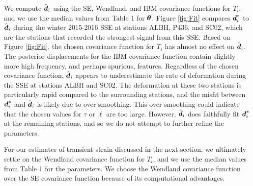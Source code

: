 \documentclass[extra,mreferee]{gji}
\begin{document}
We compute $\hat{\data}_i$ using the SE, Wendland, and IBM covariance
functions for $T_i$, and we use the median values from Table 1 for
$\mitbf{\theta}$. Figure \ref{fig:Fit} compares $\data_i^*$ to
$\hat{\data}_i$ during the winter 2015-2016 SSE at stations ALBH,
P436, and SC02, which are the stations that recorded the strongest
signal from this SSE. Based on Figure \ref{fig:Fit}, the chosen
covariance function for $T_i$ has almost no effect on $\hat{\data}_i$.
The posterior displacements for the IBM covariance function contain
slightly more high frequency, and perhaps spurious, features.
Regardless of the chosen covariance function, $\hat{\data}_i$ appears
to underestimate the rate of deformation during the SSE at stations
ALBH and SC02. The deformation at these two stations is particularly
rapid compared to the surrounding stations, and the misfit between
$\data_i^*$ and $\hat{\data}_i$ is likely due to over-smoothing. This
over-smoothing could indicate that the chosen values for $\tau$ or
$\ell$ are too large. However, $\hat{\data}_i$ does faithfully fit
$\data_i^*$ at the remaining stations, and so we do not attempt to
further refine the parameters.


For our estimates of transient strain discussed in the next section,
we ultimately settle on the Wendland covariance function for $T_i$,
and we use the median values from Table 1 for the parameters. We
choose the Wendland covariance function over the SE covariance
function because of its computational advantages.
\end{document}
